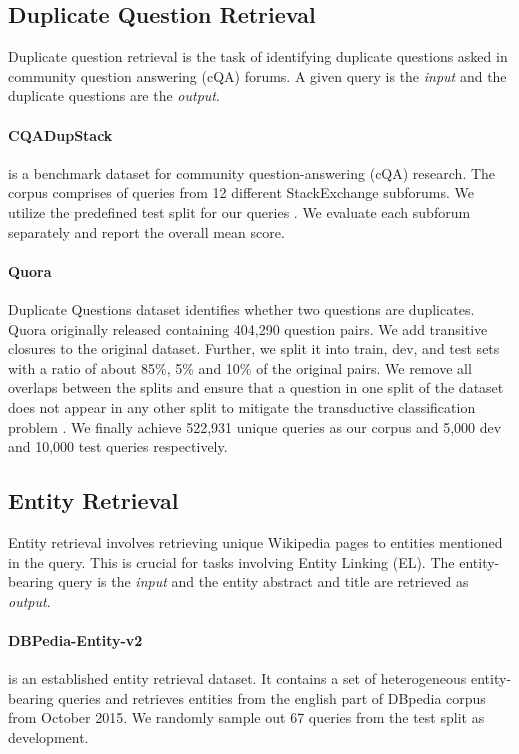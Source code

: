 \documentclass[11pt]{article}
\begin{document}
\subsection{Duplicate Question Retrieval}

Duplicate question retrieval is the task of identifying duplicate questions asked in community question answering (cQA) forums. A given query is the \textit{input} and the duplicate questions are the \textit{output}.

\paragraph{CQADupStack} \cite{hoogeveen2015cqadupstack} is a benchmark dataset for community question-answering (cQA) research. The corpus  comprises of queries from 12 different StackExchange subforums. We utilize the predefined test split for our queries . We evaluate each subforum separately and report the overall mean score.

\paragraph{Quora} Duplicate Questions dataset identifies whether two questions are duplicates. Quora originally released containing 404,290 question pairs. We add transitive closures to the original dataset. Further, we split it into train, dev, and test sets with a ratio of about 85\%, 5\% and 10\% of the original pairs. We remove all overlaps between the splits and ensure that a question in one split of the dataset does not appear in any other split to mitigate the transductive classification problem \cite{10.1007/978-3-642-15880-3_42}. We finally achieve 522,931 unique queries as our corpus  and 5,000 dev and 10,000 test queries  respectively.

\subsection{Entity Retrieval}
Entity retrieval involves retrieving unique Wikipedia pages to entities mentioned in the query. This is crucial for tasks involving Entity Linking (EL). The entity-bearing query is the \textit{input} and the entity abstract and title are retrieved as \textit{output}.

\paragraph{DBPedia-Entity-v2} \cite{Hasibi:2017:DVT} is an established entity retrieval dataset. It contains a set of heterogeneous entity-bearing queries  and retrieves entities from the english part of DBpedia corpus  from October 2015. We randomly sample out 67 queries from the test split as development.
\end{document}
